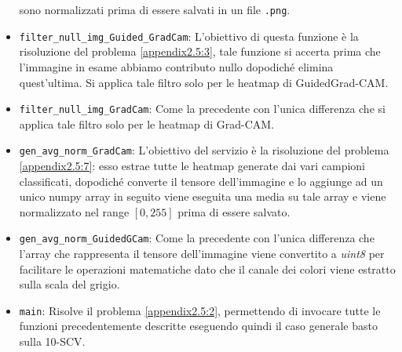 \begin{itemize}
    sono normalizzati prima di essere salvati in un file \texttt{.png}.
    \item \texttt{filter\_null\_img\_Guided\_GradCam}: L'obiettivo di questa funzione è la risoluzione del problema
    \ref{appendix2.5:3}, tale funzione si accerta prima che l'immagine in esame abbiamo contributo nullo dopodiché
    elimina quest'ultima. Si applica tale filtro solo per le heatmap di GuidedGrad-CAM.
    \item \texttt{filter\_null\_img\_GradCam}: Come la precedente con l'unica differenza che si applica tale filtro 
           solo per le heatmap di Grad-CAM.
    \item \texttt{gen\_avg\_norm\_GradCam}: L'obiettivo del servizio è la risoluzione del problema \ref{appendix2.5:7}:
    esso estrae tutte le heatmap generate dai vari campioni classificati, dopodiché converte il tensore dell'immagine e
    lo aggiunge ad un unico numpy array in seguito viene eseguita una media su tale array e viene normalizzato nel range
    $[0, 255]$ prima di essere salvato. 
    \item \texttt{gen\_avg\_norm\_GuidedGCam}: Come la precedente con l'unica differenza che l'array che rappresenta il
    tensore dell'immagine viene convertito a \textit{uint8} per facilitare le operazioni matematiche dato che il canale
    dei colori viene estratto sulla scala del grigio.
    \item \texttt{main}: Risolve il problema \ref{appendix2.5:2}, permettendo di invocare tutte le funzioni
    precedentemente descritte eseguendo quindi il caso generale basto sulla 10-SCV.    
\end{itemize}

